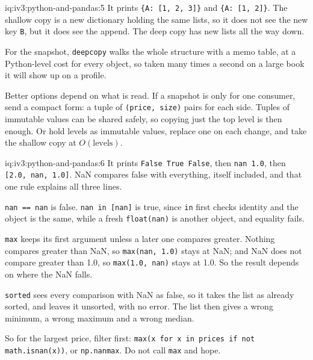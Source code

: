 \begin{solution}{iq:iv3:python-and-pandas:5}
It prints \texttt{\{\textquotesingle A\textquotesingle: [1, 2, 3]\}} and \texttt{\{\textquotesingle A\textquotesingle: [1, 2]\}}. The shallow copy is a new dictionary holding the same lists, so it does not see the new key \texttt{B}, but it does see the append. The deep copy has new lists all the way down.

For the snapshot, \texttt{deepcopy} walks the whole structure with a memo table, at a Python-level cost for every object, so taken many times a second on a large book it will show up on a profile.

Better options depend on what is read. If a snapshot is only for one consumer, send a compact form: a tuple of \texttt{(price, size)} pairs for each side. Tuples of immutable values can be shared safely, so copying just the top level is then enough. Or hold levels as immutable values, replace one on each change, and take the shallow copy at $O(\text{levels})$.

\end{solution}

\begin{solution}{iq:iv3:python-and-pandas:6}
It prints \texttt{False True False}, then \texttt{nan 1.0}, then \texttt{[2.0, nan, 1.0]}. NaN compares false with everything, itself included, and that one rule explains all three lines.

\texttt{nan == nan} is false. \texttt{nan in [nan]} is true, since \texttt{in} first checks identity and the object is the same, while a fresh \texttt{float(\textquotesingle nan\textquotesingle)} is another object, and equality fails.

\texttt{max} keeps its first argument unless a later one compares greater. Nothing compares greater than NaN, so \texttt{max(nan, 1.0)} stays at NaN; and NaN does not compare greater than 1.0, so \texttt{max(1.0, nan)} stays at 1.0. So the result depends on where the NaN falls.

\texttt{sorted} sees every comparison with NaN as false, so it takes the list as already sorted, and leaves it unsorted, with no error. The list then gives a wrong minimum, a wrong maximum and a wrong median.

So for the largest price, filter first: \texttt{max(x for x in prices if not math.isnan(x))}, or \texttt{np.nanmax}. Do not call \texttt{max} and hope.

\end{solution}

